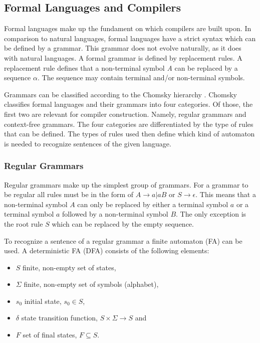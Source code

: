 \subsection{Formal Languages and Compilers}

Formal languages make up the fundament on which compilers are built upon. In comparison to natural languages, formal languages have a strict syntax which can be defined by a grammar. This grammar does not evolve naturally, as it does with natural languages. A formal grammar is defined by replacement rules. A replacement rule defines that a non-terminal symbol \textit{A} can be replaced by a sequence $\alpha$. The sequence may contain terminal and/or non-terminal symbols. 

Grammars can be classified according to the Chomsky hierarchy \parencite{CHOMSKY1959137}. Chomsky classifies formal languages and their grammars into four categories. Of those, the first two are relevant for compiler construction. Namely, regular grammars and context-free grammars. The four categories are differentiated by the type of rules that can be defined. The types of rules used then define which kind of automaton is needed to recognize sentences of the given language. 

\subsubsection{Regular Grammars}

Regular grammars make up the simplest group of grammars. For a grammar to be regular all rules must be in the form of $A\rightarrow a | a B$ or $S\rightarrow \epsilon$. This means that a non-terminal symbol $A$ can only be replaced by either a terminal symbol $a$ or a terminal symbol $a$ followed by a non-terminal symbol $B$. The only exception is the root rule $S$ which can be replaced by the empty sequence. 

To recognize a sentence of a regular grammar a finite automaton (FA) can be used. A deterministic FA (DFA) consists of the following elements:

\begin{itemize}
    \item $S$ finite, non-empty set of states,
    \item $\Sigma$ finite, non-empty set of symbols (alphabet),
    \item $s_0$ initial state, $s_0 \in S$,
    \item $\delta$ state transition function, $S \times \Sigma \rightarrow S$ and
    \item $F$ set of final states, $F \subseteq S$.
\end{itemize}

